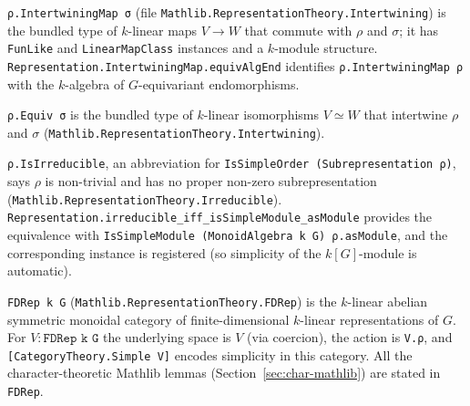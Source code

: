 \begin{definition}
  \label{def:intertwiner}
  \mathlibok
  \texttt{ρ.IntertwiningMap σ} (file
  \texttt{Mathlib.RepresentationTheory.Intertwining}) is the bundled type of
  $k$-linear maps $V \to W$ that commute with $\rho$ and $\sigma$; it has
  \texttt{FunLike} and \texttt{LinearMapClass} instances and a $k$-module
  structure. \texttt{Representation.IntertwiningMap.equivAlgEnd} identifies
  \texttt{ρ.IntertwiningMap ρ} with the $k$-algebra of $G$-equivariant
  endomorphisms.
\end{definition}

\begin{definition}
  \label{def:rep-equiv}
  \mathlibok
  \texttt{ρ.Equiv σ} is the bundled type of $k$-linear isomorphisms
  $V \simeq W$ that intertwine $\rho$ and $\sigma$
  (\texttt{Mathlib.RepresentationTheory.Intertwining}).
\end{definition}

\begin{definition}
  \label{def:irreducible}
  \mathlibok
  \texttt{ρ.IsIrreducible}, an abbreviation for
  \texttt{IsSimpleOrder (Subrepresentation ρ)}, says $\rho$ is non-trivial and
  has no proper non-zero subrepresentation
  (\texttt{Mathlib.RepresentationTheory.Irreducible}).
  \texttt{Representation.irreducible\_iff\_isSimpleModule\_asModule} provides
  the equivalence with \texttt{IsSimpleModule (MonoidAlgebra k G) ρ.asModule},
  and the corresponding instance is registered (so simplicity of the
  $k[G]$-module is automatic).
\end{definition}

\begin{definition}
  \label{def:fdrep}
  \mathlibok
  \texttt{FDRep k G} (\texttt{Mathlib.RepresentationTheory.FDRep}) is the
  $k$-linear abelian symmetric monoidal category of finite-dimensional
  $k$-linear representations of $G$. For $V : \texttt{FDRep k G}$ the
  underlying space is $V$ (via coercion), the action is \texttt{V.ρ}, and
  \texttt{[CategoryTheory.Simple V]} encodes simplicity in this category.
  All the character-theoretic Mathlib lemmas (Section~\ref{sec:char-mathlib})
  are stated in \texttt{FDRep}.
\end{definition}


